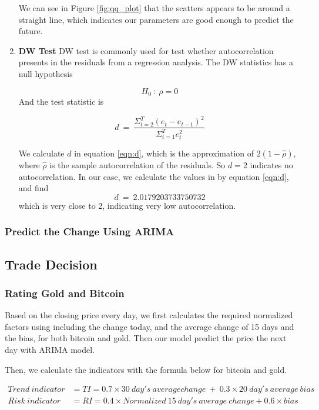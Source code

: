 \documentclass[12pt,a4paper]{article}
\newcommand{\Predictor}{ARIMA }
\begin{document}
\begin{spacing}{1.2}
\begin{enumerate}
	We can see in Figure \ref{fig:qq_plot} that the scatters appears to be around a straight line, which indicates our parameters are good enough to predict the future.
	
	\item \textbf{DW Test}
	DW test is commonly used for test whether autocorrelation presents in the residuals from a regression analysis. The DW statistics has a null hypothesis
	
$$
	H_0 \ : \ \rho = 0	
$$
	And the test statistic is
	
	\begin{equation}\label{eqn:d}
		d \ = \ \frac{\Sigma_{t=2}^T(e_t-e_{t-1})^2}{\Sigma_{t=1}^T e_t^2}
	\end{equation}

	We calculate $d$ in equation \ref{eqn:d}, which is the approximation of $2(1-\hat{\rho})$, where $\hat{\rho}$ is the sample autocorrelation of the residuals. So $d=2$ indicates no autocorrelation. In our case, we calculate the values in by equation \ref{eqn:d}, and find
	$$
	d \ = \ 2.0179203733750732
	$$
	which is very close to 2, indicating very low autocorrelation. 
\end{enumerate}


\subsubsection{Predict the Change Using \Predictor}


\subsection{Trade Decision}

\subsubsection{Rating Gold and Bitcoin}

Based on the closing price every day, we first calculates the required normalized factors using including the change today, and the average change of 15 days and the bias, for both bitcoin and gold. Then our model predict the price the next day with ARIMA model.
	
Then, we calculate the indicators with the formula below for bitcoin and gold. 
	
	
\begin{align*}
Trend \ indicator &= TI = 0.7 \times 30 \ day's \ average change \ + \ 0.3 \times 20 \ day's \ average \ bias \\
Risk \ indicator &= RI = 0.4 \times Normalized \ 15 \ day's \ average \ change + 0.6 \times bias
\end{align*}
	

\end{spacing}
\end{document}
